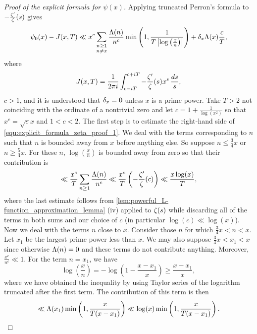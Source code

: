    \begin{proof}[Proof of the explicit formula for $\psi(x)$]
      Applying truncated Perron's formula to $-\frac{\zeta'}{\zeta}(s)$ gives
      \begin{equation}\label{equ:explicit_formula_zeta_proof_1}
        \psi_{0}(x)-J(x,T) \ll x^{c}\sum_{\substack{n \ge 1 \\ n \neq x}}\frac{\Lambda(n)}{n^{c}}\min\left(1,\frac{1}{T\left|\log\left(\frac{x}{n}\right)\right|}\right)+\delta_{x}\Lambda(x)\frac{c}{T},
      \end{equation}
      where
      \[
        J(x,T) = \frac{1}{2\pi i}\int_{c-iT}^{c+iT}-\frac{\zeta'}{\zeta}(s)x^{s}\,\frac{ds}{s},
      \]
      $c > 1$, and it is understood that $\delta_{x} = 0$ unless $x$ is a prime power. Take $T > 2$ not coinciding with the ordinate of a nontrivial zero and let $c = 1+\frac{1}{\log(x^{2})}$ so that $x^{c} = \sqrt{e}x$ and $1 < c < 2$. The first step is to estimate the right-hand side of \cref{equ:explicit_formula_zeta_proof_1}. We deal with the terms corresponding to $n$ such that $n$ is bounded away from $x$ before anything else. So suppose $n \le \frac{3}{4}x$ or $n \ge \frac{5}{4}x$. For these $n$, $\log\left(\frac{x}{n}\right)$ is bounded away from zero so that their contribution is
      \begin{equation}\label{equ:explicit_formula_zeta_proof_2}
        \ll \frac{x^{c}}{T}\sum_{n \ge 1}\frac{\Lambda(n)}{n^{c}} \ll \frac{x^{c}}{T}\left(-\frac{\zeta'}{\zeta}(c)\right) \ll \frac{x\log(x)}{T},
      \end{equation}
      where the last estimate follows from \cref{lem:powerful_L-function_approximation_lemma} (iv) applied to $\zeta(s)$ while discarding all of the terms in both sums and our choice of $c$ (in particular $\log(c) \ll \log(x)$). Now we deal with the terms $n$ close to $x$. Consider those $n$ for which $\frac{3}{4}x < n < x$. Let $x_{1}$ be the largest prime power less than $x$. We may also suppose $\frac{3}{4}x < x_{1} < x$ since otherwise $\Lambda(n) = 0$ and these terms do not contribute anything. Moreover, $\frac{x^{c}}{n^{c}} \ll 1$. For the term $n = x_{1}$, we have
      \[
        \log\left(\frac{x}{n}\right) = -\log\left(1-\frac{x-x_{1}}{x}\right) \ge \frac{x-x_{1}}{x},
      \]
      where we have obtained the inequality by using Taylor series of the logarithm truncated after the first term. The contribution of this term is then
      \begin{equation}\label{equ:explicit_formula_zeta_proof_3}
        \ll \L(x_{1})\min\left(1,\frac{x}{T(x-x_{1})}\right) \ll \log(x)\min\left(1,\frac{x}{T(x-x_{1})}\right).

\end{equation}
\end{proof}
